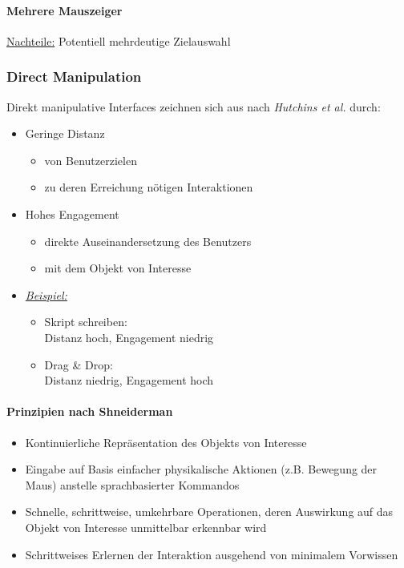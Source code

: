 \documentclass[8pt,a4paper,landscape]{extarticle}
\newcommand{\example}{\textit{\underline{Beispiel:} }}
\begin{document}
\begin{multicols*}{4}
	\paragraph{Mehrere Mauszeiger} \underline{Nachteile:} Potentiell mehrdeutige
	Zielauswahl
	\subsubsection{Direct Manipulation}
	Direkt manipulative Interfaces zeichnen sich aus nach \emph{Hutchins et al.}
	durch:
	\begin{itemize}
		\item Geringe Distanz
		      \begin{itemize}[nolistsep]
			      \item von Benutzerzielen
			      \item zu deren Erreichung nötigen Interaktionen
		      \end{itemize}
		\item Hohes Engagement
		      \begin{itemize}[nolistsep]
			      \item direkte Auseinandersetzung des Benutzers
			      \item mit dem Objekt von Interesse
		      \end{itemize}
		\item \example
		      \begin{itemize}[nolistsep]
			      \item Skript schreiben:\\ Distanz hoch, Engagement niedrig
			      \item Drag \& Drop:\\ Distanz niedrig, Engagement hoch
		      \end{itemize}
	\end{itemize}
	\paragraph{Prinzipien nach Shneiderman}
	\begin{itemize}
		\item Kontinuierliche Repräsentation des Objekts von Interesse
		\item Eingabe auf Basis einfacher physikalische Aktionen
		      (z.B. Bewegung der Maus) anstelle sprachbasierter Kommandos
		\item Schnelle, schrittweise, umkehrbare Operationen, deren Auswirkung
		      auf das Objekt von Interesse unmittelbar erkennbar wird
		\item Schrittweises Erlernen der Interaktion ausgehend von minimalem
		      Vorwissen
	\end{itemize}

\end{multicols*}
\end{document}
